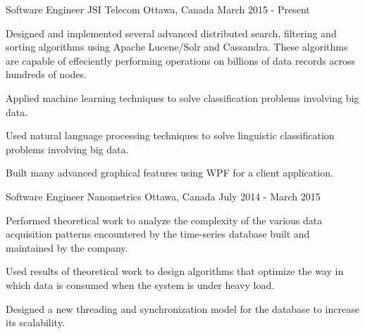 


\begin{cventries}


\cventry
{Software Engineer} %
{JSI Telecom} %
{Ottawa, Canada} %
{March 2015 - Present} %
{ %
\begin{cvitems}
  \item {Designed and implemented several advanced distributed search, filtering and sorting algorithms using Apache Lucene/Solr and Cassandra. These algorithms are capable of effeciently performing operations on billions of data records across hundreds of nodes.}
  \item {Applied machine learning techniques to solve classification problems involving big data.}
  \item {Used natural language processing techniques to solve linguistic classification problems involving big data.}
  \item {Built many advanced graphical features using WPF for a client application.}
\end{cvitems}
}

\vspace{-2.5ex}
\cventry
{Software Engineer} %
{Nanometrics} %
{Ottawa, Canada} %
{July 2014 - March 2015} %
{ %
\begin{cvitems}
  \item {Performed theoretical work to analyze the complexity of the various data acquisition patterns encountered by the time-series database built and maintained by the company.}
  \item {Used results of theoretical work to design algorithms that optimize the way in which data is consumed when the system is under heavy load.}
  \item {Designed a new threading and synchronization model for the database to increase its scalability.}
\end{cvitems}
}


\vspace{-4ex}


\end{cventries}

